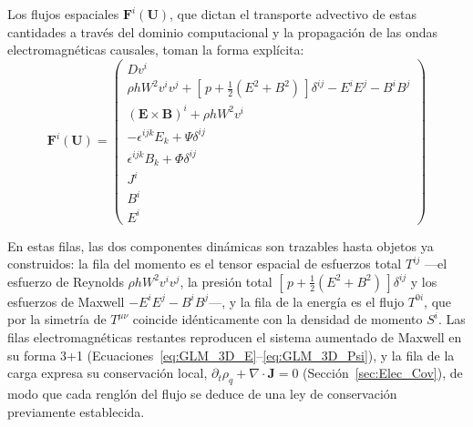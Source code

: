 Los flujos espaciales $\mathbf{F}^i(\mathbf{U})$, que dictan el transporte advectivo de estas cantidades a través del dominio computacional y la propagación de las ondas electromagnéticas causales, toman la forma explícita:
\begin{equation}
    \mathbf{F}^i(\mathbf{U}) = 
    \begin{pmatrix}
        D v^i \\
        \rho h W^2 v^i v^j + \left[\, p + \tfrac{1}{2}(E^2+B^2) \,\right]\delta^{ij} - E^i E^j - B^i B^j \\
        (\mathbf{E}\times\mathbf{B})^i + \rho h W^2 v^i \\
        -\epsilon^{ijk} E_k + \Psi \delta^{ij} \\
        \epsilon^{ijk} B_k + \Phi \delta^{ij} \\
        J^i \\
        B^i \\
        E^i
    \end{pmatrix}
\end{equation}

En estas filas, las dos componentes dinámicas son trazables hasta objetos ya construidos: la fila del momento es el tensor espacial de esfuerzos total $T^{ij}$ ---el esfuerzo de Reynolds $\rho h W^2 v^i v^j$, la presión total $[\,p + \tfrac{1}{2}(E^2+B^2)\,]\delta^{ij}$ y los esfuerzos de Maxwell $-E^i E^j - B^i B^j$---, y la fila de la energía es el flujo $T^{0i}$, que por la simetría de $T^{\mu\nu}$ coincide idénticamente con la densidad de momento $S^i$. Las filas electromagnéticas restantes reproducen el sistema aumentado de Maxwell en su forma 3+1 (Ecuaciones~\eqref{eq:GLM_3D_E}--\eqref{eq:GLM_3D_Psi}), y la fila de la carga expresa su conservación local, $\partial_t \rho_q + \nabla\cdot\mathbf{J} = 0$ (Sección~\ref{sec:Elec_Cov}), de modo que cada renglón del flujo se deduce de una ley de conservación previamente establecida.

